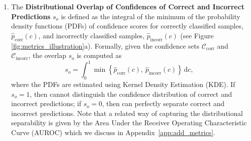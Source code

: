 \begin{enumerate}
    \item The \textbf{Distributional Overlap of Confidences of Correct and Incorrect Predictions} $s_o$ is defined as the integral of the minimum of the probability density functions (PDFs) of confidence scores for correctly classified samples, $\hat{p}_{\text{corr}}(c)$, and incorrectly classified samples, $\hat{p}_{\text{incorr}}(c)$ (see Figure \ref{fig:metrics_illustration}a). Formally, given the confidence sets $\mathcal{C}_\text{corr}$ and $\mathcal{C}_\text{incorr}$, the overlap $s_o$ is computed as
\begin{equation}
    s_o = \int_{0}^{1} \min\left\{ \hat{p}_{\text{corr}}(c),\ \hat{p}_{\text{incorr}}(c) \right\} \, \mathrm{d}c,
\end{equation}
where the PDFs are estimated using Kernel Density Estimation (KDE). If $s_o = 1$, then \smallmodel cannot distinguish the confidence distribution of correct and incorrect predictions; if $s_o = 0$, then \smallmodel can perfectly separate correct and incorrect predictions. Note that a related way of capturing the distributional separability is given by the Area Under the Receiver Operating Characteristic Curve (AUROC) which we discuss in Appendix~\ref{app:add_metrics}.


\end{enumerate}
